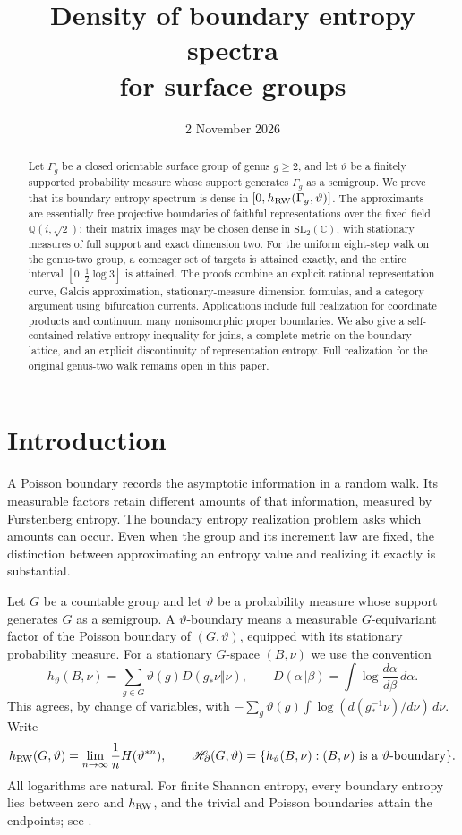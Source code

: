 \documentclass[11pt,letterpaper]{amsart}
\title[Boundary entropy spectra for surface groups]{Density of boundary entropy spectra\\for surface groups}
\date{2 November 2026}
\theoremstyle{definition}
\theoremstyle{remark}
\numberwithin{equation}{section}
\newcommand{\HH}{\mathscr H_{\partial}}
\begin{document}
\begin{abstract}
Let $\Gamma_g$ be a closed orientable surface group of genus $g\ge2$, and
let $\vartheta$ be a finitely supported probability measure whose support
generates $\Gamma_g$ as a semigroup. We prove that its boundary entropy
spectrum is dense in $[0,h_{\rm RW}(\Gamma_g,\vartheta)]$. The approximants
are essentially free projective boundaries of faithful representations
over the fixed field $\mathbb Q(i,\sqrt2)$; their matrix images may be
chosen dense in $\mathrm{SL}_2(\mathbb C)$, with stationary measures of
full support and exact dimension two. For the uniform eight-step walk
on the genus-two group, a comeager set of targets is attained exactly,
and the entire interval $[0,\frac12\log3]$ is attained. The proofs combine
an explicit rational representation curve, Galois approximation,
stationary-measure dimension formulas, and a category argument using
bifurcation currents. Applications include full realization for
coordinate products and continuum many nonisomorphic proper boundaries.
We also give a self-contained relative entropy inequality for joins,
a complete metric on the boundary lattice, and an explicit discontinuity
of representation entropy. Full realization for the original genus-two
walk remains open in this paper.
\end{abstract}
\maketitle

\section{Introduction}
\label{sec:introduction}

A Poisson boundary records the asymptotic information in a random walk.
Its measurable factors retain different amounts of that information,
measured by Furstenberg entropy. The boundary entropy realization problem
asks which amounts can occur. Even when the group and its increment law
are fixed, the distinction between approximating an entropy value and
realizing it exactly is substantial.

Let $G$ be a countable group and let $\vartheta$ be a probability measure
whose support generates $G$ as a semigroup. A $\vartheta$-boundary means a
measurable $G$-equivariant factor of the Poisson boundary of
$(G,\vartheta)$, equipped with its stationary probability measure. For a
stationary $G$-space $(B,\nu)$ we use the convention
\[
 h_\vartheta(B,\nu)
 =\sum_{g\in G}\vartheta(g)D(g_*\nu\Vert\nu),
 \qquad
 D(\alpha\Vert\beta)=\int\log\frac{d\alpha}{d\beta}\,d\alpha.
\]
This agrees, by change of variables, with
$-\sum_g\vartheta(g)\int\log(d(g^{-1}_*\nu)/d\nu)\,d\nu$.
Write
\[
 h_{\rm RW}(G,\vartheta)=\lim_{n\to\infty}\frac1nH(\vartheta^{*n}),
 \qquad
 \HH(G,\vartheta)=\{h_\vartheta(B,\nu):(B,\nu)\text{ is a }
 \vartheta\text{-boundary}\}.
\]
All logarithms are natural. For finite Shannon entropy, every boundary
entropy lies between zero and $h_{\rm RW}$, and the trivial and Poisson
boundaries attain the endpoints; see \cite{KV,Kaimanovich}.
\end{document}

